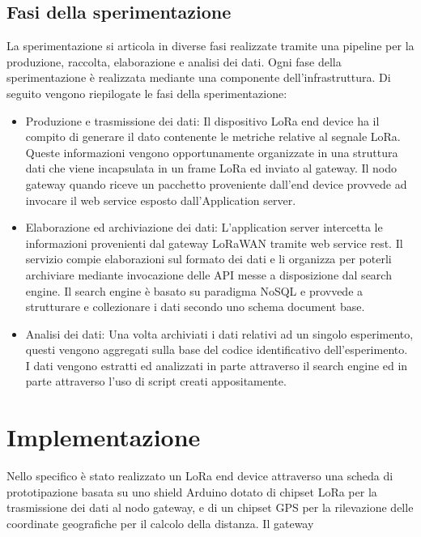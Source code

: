 \documentclass[12pt,a4paper,openright,twoside]{report}
\begin{document}
\section{Fasi della sperimentazione}
La sperimentazione si articola in diverse fasi realizzate tramite una pipeline per la produzione, raccolta, elaborazione e analisi dei dati. Ogni fase della sperimentazione è realizzata mediante una componente dell'infrastruttura. 
Di seguito vengono riepilogate le fasi della sperimentazione:
\begin{itemize}                       
\item Produzione e trasmissione dei dati: Il dispositivo LoRa end device ha il compito di generare il dato contenente le metriche relative al segnale LoRa. Queste informazioni vengono opportunamente organizzate in una struttura dati che viene incapsulata in un frame LoRa ed inviato al gateway. Il nodo gateway quando riceve un pacchetto proveniente dall'end device provvede ad invocare il web service esposto dall'Application server.
\item Elaborazione ed archiviazione dei dati: L'application server intercetta le informazioni provenienti dal gateway LoRaWAN tramite web service rest. Il servizio compie elaborazioni sul formato dei dati e li organizza per poterli archiviare mediante invocazione delle API messe a disposizione dal search engine. Il search engine è basato su paradigma NoSQL e provvede a strutturare e collezionare i dati secondo uno schema document base.
\item Analisi dei dati: Una volta archiviati i dati relativi ad un singolo esperimento, questi vengono aggregati sulla base del codice identificativo dell'esperimento. I dati vengono estratti ed analizzati in parte attraverso il search engine ed in parte attraverso l'uso di script creati appositamente.   
\end{itemize}



\chapter{Implementazione}
Nello specifico \`e stato realizzato un LoRa end device attraverso una scheda di prototipazione basata su uno shield Arduino dotato di chipset LoRa per la trasmissione dei dati al nodo gateway, e di un chipset GPS per la rilevazione delle coordinate geografiche per il calcolo della distanza. Il gateway   
\end{document}
